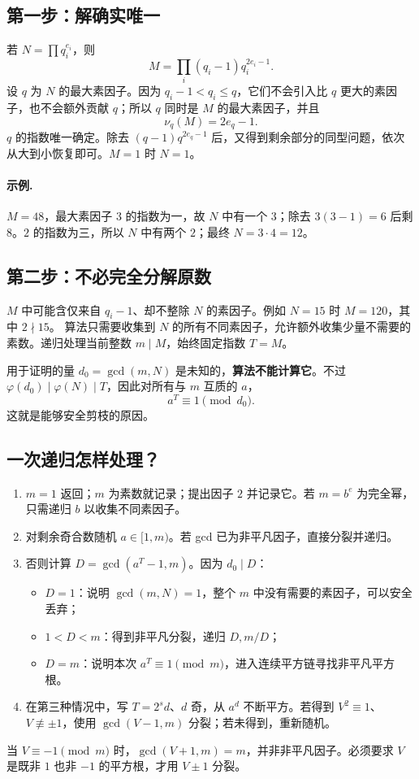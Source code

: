 \documentclass[UTF8,a4paper,11pt,oneside,openany,fontset=fandol]{ctexbook}
\theoremstyle{definition}
\begin{document}
\subsection{第一步：解确实唯一}
若 $N=\prod q_i^{e_i}$，则
\[
 M=\prod_i(q_i-1)q_i^{2e_i-1}.
\]
设 $q$ 为 $N$ 的最大素因子。因为 $q_i-1<q_i\le q$，它们不会引入比 $q$ 更大的素因子，也不会额外贡献 $q$；所以 $q$ 同时是 $M$ 的最大素因子，并且
\[
 \nu_q(M)=2e_q-1.
\]
$q$ 的指数唯一确定。除去 $(q-1)q^{2e_q-1}$ 后，又得到剩余部分的同型问题，依次从大到小恢复即可。$M=1$ 时 $N=1$。

\paragraph{示例.} $M=48$，最大素因子 $3$ 的指数为一，故 $N$ 中有一个 $3$；除去 $3(3-1)=6$ 后剩 $8$。$2$ 的指数为三，所以 $N$ 中有两个 $2$；最终 $N=3\cdot4=12$。

\subsection{第二步：不必完全分解原数}
$M$ 中可能含仅来自 $q_i-1$、却不整除 $N$ 的素因子。例如 $N=15$ 时 $M=120$，其中 $2\nmid15$。
算法只需要收集到 $N$ 的所有不同素因子，允许额外收集少量不需要的素数。递归处理当前整数 $m\mid M$，始终固定指数 $T=M$。

用于证明的量 $d_0=\gcd(m,N)$ 是未知的，\textbf{算法不能计算它}。不过 $\varphi(d_0)\mid\varphi(N)\mid T$，因此对所有与 $m$ 互质的 $a$，
\[
 a^T\equiv1\pmod{d_0}.
\]
这就是能够安全剪枝的原因。

\subsection{一次递归怎样处理？}
\begin{enumerate}
\item $m=1$ 返回；$m$ 为素数就记录；提出因子 $2$ 并记录它。若 $m=b^e$ 为完全幂，只需递归 $b$ 以收集不同素因子。
\item 对剩余奇合数随机 $a\in[1,m)$。若 gcd 已为非平凡因子，直接分裂并递归。
\item 否则计算 $D=\gcd(a^T-1,m)$。因为 $d_0\mid D$：
\begin{itemize}
\item $D=1$：说明 $\gcd(m,N)=1$，整个 $m$ 中没有需要的素因子，可以安全丢弃；
\item $1<D<m$：得到非平凡分裂，递归 $D,m/D$；
\item $D=m$：说明本次 $a^T\equiv1\pmod m$，进入连续平方链寻找非平凡平方根。
\end{itemize}
\item 在第三种情况中，写 $T=2^sd$、$d$ 奇，从 $a^d$ 不断平方。若得到 $V^2\equiv1$、$V\not\equiv\pm1$，使用 $\gcd(V-1,m)$ 分裂；若未得到，重新随机。
\end{enumerate}
\begin{pitfall}[原稿中一个使算法直接失效的符号错误]
当 $V\equiv-1\pmod m$ 时，$\gcd(V+1,m)=m$，并非非平凡因子。必须要求 $V$ 是既非 $1$ 也非 $-1$ 的平方根，才用 $V\pm1$ 分裂。
\end{pitfall}
\end{document}
